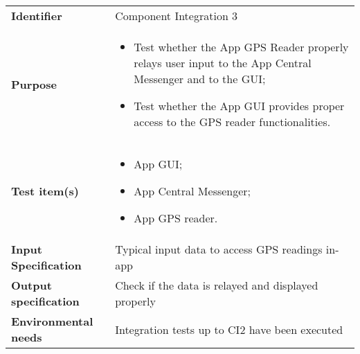 
\begin{center}
\begin{tabular}{lp{}}
\toprule
\textbf{Identifier}		&	Component Integration 3\\
\textbf{Purpose}		&	\begin{itemize}
					\item Test whether the App GPS Reader properly relays user input to the App Central Messenger and to the GUI;
					\item Test whether the App GUI provides proper access to the GPS reader functionalities.
					\end{itemize}	\\
\textbf{Test item(s)}	&	\begin{itemize}
					\item App GUI;
					\item App Central Messenger;
					\item App GPS reader.
					\end{itemize}	\\
\textbf{Input Specification}	&	Typical input data to access GPS readings in-app\\
\textbf{Output specification}	&	Check if the data is relayed and displayed properly\\
\textbf{Environmental needs}	&	Integration tests up to CI2 have been executed\\
\bottomrule
\end{tabular}
\end{center}


